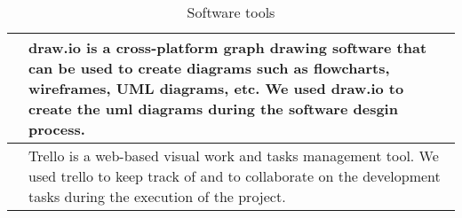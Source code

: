 \begin{table}[hbt!]
\begin{tabular}{ | m{} | m{} | }
            \hline
            \centering    & draw.io is a cross-platform graph drawing software that can be used to create diagrams such as flowcharts, wireframes, UML diagrams, etc. We used draw.io to create the uml diagrams during the software desgin process.                                                                                                       \\
            \hline
            \centering    & Trello is a web-based visual work and tasks management tool. We used trello to keep track of and to collaborate on the development tasks during the execution of the project.                                                                                                                                                  \\
            \hline
      \end{tabular}
      \caption{Software tools}
      \label{tools}
\end{table}
